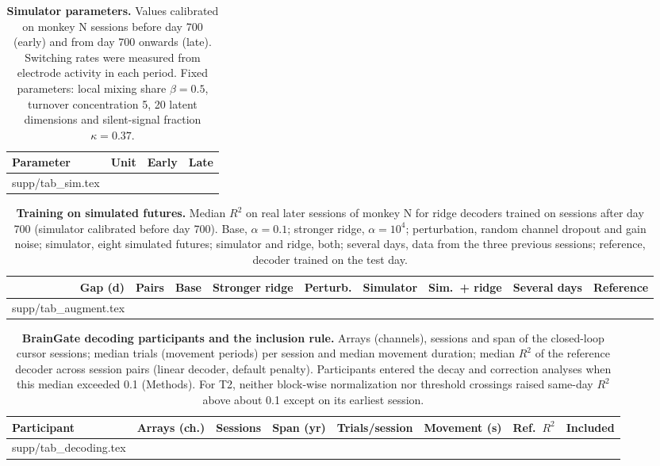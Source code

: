 \documentclass[pdflatex,sn-nature]{sn-jnl}
\makeatletter
\newcommand\tabinput[1]{\@@input #1 }
\makeatother
\begin{document}
\begin{table}[p]
\caption{\textbf{Simulator parameters.} Values calibrated on monkey N sessions before day 700 (early) and from day 700
onwards (late). Switching rates were measured from electrode activity in each period. Fixed parameters: local mixing
share $\beta = 0.5$, turnover concentration 5, 20 latent dimensions and silent-signal fraction $\kappa = 0.37$.}
\label{tab:sim}
\scriptsize\setlength{\tabcolsep}{3.5pt}
\begin{tabular}{@{}llrr@{}}
\toprule
Parameter & Unit & Early & Late \\
\midrule
\tabinput{supp/tab_sim.tex}
\botrule
\end{tabular}
\end{table}

\begin{landscape}
\begin{table}[p]
\caption{\textbf{Training on simulated futures.} Median $R^2$ on real later sessions of monkey N for ridge decoders
trained on sessions after day 700 (simulator calibrated before day 700). Base, $\alpha = 0.1$; stronger ridge,
$\alpha = 10^4$; perturbation, random channel dropout and gain noise; simulator, eight simulated futures; simulator and
ridge, both; several days, data from the three previous sessions; reference, decoder trained on the test day.}
\label{tab:augment}
\scriptsize\setlength{\tabcolsep}{3pt}
\begin{tabular}{@{}rrrrrrrrr@{}}
\toprule
Gap (d) & Pairs & Base & Stronger ridge & Perturb. & Simulator & Sim.\ + ridge & Several days & Reference \\
\midrule
\tabinput{supp/tab_augment.tex}
\botrule
\end{tabular}
\end{table}
\end{landscape}

\begin{table}[p]
\caption{\textbf{BrainGate decoding participants and the inclusion rule.} Arrays (channels), sessions and span of the
closed-loop cursor sessions; median trials (movement periods) per session and median movement duration; median $R^2$ of
the reference decoder across session pairs (linear decoder, default penalty). Participants entered the decay and
correction analyses when this median exceeded 0.1 (Methods). For T2, neither block-wise normalization nor threshold
crossings raised same-day $R^2$ above about 0.1 except on its earliest session.}
\label{tab:decoding}
\footnotesize\setlength{\tabcolsep}{4pt}
\begin{tabular}{@{}lccccccc@{}}
\toprule
Participant & Arrays (ch.) & Sessions & Span (yr) & Trials/session & Movement (s) & Ref.\ $R^2$ & Included \\
\midrule
\tabinput{supp/tab_decoding.tex}
\botrule
\end{tabular}
\end{table}
\end{document}
